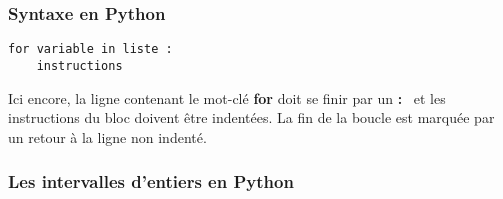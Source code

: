 

\subsubsection{Syntaxe en Python}

\begin{lstlisting}
for variable in liste :
    instructions
\end{lstlisting}

Ici encore, la ligne contenant le mot-clé \textbf{for} doit se finir par un \og \textbf{:} \fg\ et les 
instructions du bloc doivent être indentées. La fin de la boucle est marquée par un retour à la 
ligne non indenté.\\
%
%
%
%



\subsubsection{Les intervalles d'entiers en Python}


